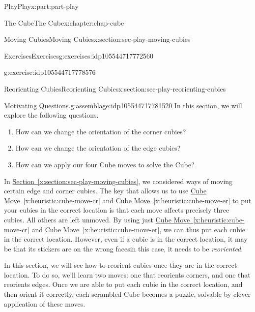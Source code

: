 \documentclass[oneside,10pt,]{book}
\newcommand{\xreffont}{\relax}
\numberwithin{equation}{section}
\begin{document}
\begin{partptx}{Play}{}{Play}{}{}{x:part:part-play}
\begin{chapterptx}{The Cube}{}{The Cube}{}{}{x:chapter:chap-cube}
\begin{sectionptx}{Moving Cubies}{}{Moving Cubies}{}{}{x:section:sec-play-moving-cubies}
\begin{exercises-subsection-numberless}{Exercises}{}{Exercises}{}{}{g:exercises:idp105544717772560}
\begin{divisionexercise}{4}{}{}{g:exercise:idp105544717778576}
\end{divisionexercise}%
\end{exercises-subsection-numberless}
\end{sectionptx}
%
%
\typeout{************************************************}
\typeout{************************************************}
%
\begin{sectionptx}{Reorienting Cubies}{}{Reorienting Cubies}{}{}{x:section:sec-play-reorienting-cubies}
\begin{assemblage}{Motivating Questions.}{g:assemblage:idp105544717781520}%
In this section, we will explore the following questions. %
\begin{enumerate}
\item{}How can we change the orientation of the corner cubies?%
\item{}How can we change the orientation of the edge cubies?%
\item{}How can we apply our four Cube moves to solve the Cube?%
\end{enumerate}
%
\end{assemblage}
\begin{introduction}{}%
In \hyperref[x:section:sec-play-moving-cubies]{Section~{\xreffont\ref{x:section:sec-play-moving-cubies}}}, we considered ways of moving certain edge and corner cubies. The key that allows us to use \hyperref[x:heuristic:cube-move-cr]{Cube Move~{\xreffont\ref{x:heuristic:cube-move-cr}}} and \hyperref[x:heuristic:cube-move-er]{Cube Move~{\xreffont\ref{x:heuristic:cube-move-er}}} to put your cubies in the correct location is that each move affects precisely three cubies. All others are left unmoved. By using just \hyperref[x:heuristic:cube-move-cr]{Cube Move~{\xreffont\ref{x:heuristic:cube-move-cr}}} and \hyperref[x:heuristic:cube-move-er]{Cube Move~{\xreffont\ref{x:heuristic:cube-move-er}}}, we can thus put each cubie in the correct location. However, even if a cubie is in the correct location, it may be that its stickers are on the wrong faces\textemdash{}in this case, it needs to be \emph{reoriented}.%
\par
In this section, we will see how to reorient cubies once they are in the correct location. To do so, we'll learn two moves: one that reorients corners, and one that reorients edges. Once we are able to put each cubie in the correct location, and then orient it correctly, each scrambled Cube becomes a puzzle, solvable by clever application of these moves.%
\end{introduction}%

\end{sectionptx}
\end{chapterptx}
\end{partptx}
\end{document}
